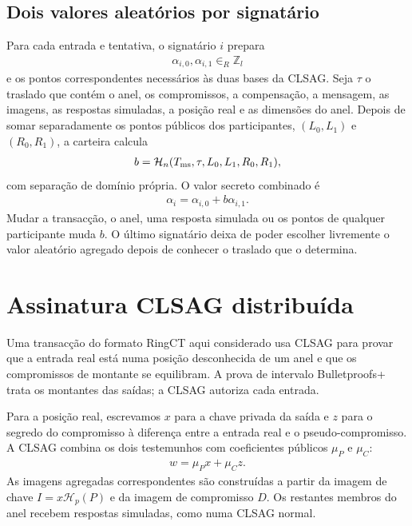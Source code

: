 \subsection{Dois valores aleatórios por signatário}

%
Para cada entrada e tentativa, o signatário \(i\) prepara
\begin{align*}
 \alpha_{i,0},\alpha_{i,1}\in_R\mathbb Z_l
\end{align*}
e os pontos correspondentes necessários às duas bases da CLSAG. Seja
\(\tau\) o traslado que contém o anel, os compromissos, a compensação, a
mensagem, as imagens, as respostas simuladas, a posição real e as dimensões
do anel. Depois de somar separadamente os pontos públicos dos participantes,
\((L_0,L_1)\) e \((R_0,R_1)\), a carteira calcula
\begin{align*}
 b=\mathcal H_n(T_{\rm ms},\tau,L_0,L_1,R_0,R_1),
\end{align*}
com separação de domínio própria. O valor secreto combinado é
\begin{align}
 \alpha_i=\alpha_{i,0}+b\alpha_{i,1}.
 \label{eq:multisig-two-nonce}
\end{align}
Mudar a transacção, o anel, uma resposta simulada ou os pontos de qualquer
participante muda \(b\). O último signatário deixa de poder escolher
livremente o valor aleatório agregado depois de conhecer o traslado que o
determina.

\section{Assinatura CLSAG distribuída}
\label{sec:rcttypebulletproof2-multisig}

Uma transacção do formato RingCT aqui considerado usa CLSAG para provar que a entrada real está numa
posição desconhecida de um anel e que os compromissos de montante se
equilibram. A prova de intervalo Bulletproofs+ trata os montantes das saídas;
a CLSAG autoriza cada entrada.

Para a posição real, escrevamos \(x\) para a chave privada da saída e \(z\)
para o segredo do compromisso à diferença entre a entrada real e o
pseudo-compromisso. A CLSAG combina os dois testemunhos com coeficientes
públicos \(\mu_P\) e \(\mu_C\):
\begin{align*}
 w=\mu_Px+\mu_Cz.
\end{align*}
As imagens agregadas correspondentes são construídas a partir da imagem de
chave \(I=x\mathcal H_p(P)\) e da imagem de compromisso \(D\). Os restantes
membros do anel recebem respostas simuladas, como numa CLSAG normal.

